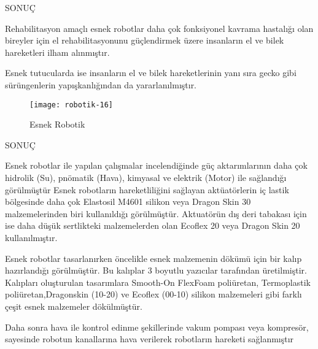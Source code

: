 \documentclass{beamer}
\begin{document}
\begin{frame}{SONUÇ}
\begin{block}
\item Rehabilitasyon amaçlı esnek robotlar daha çok fonksiyonel kavrama hastalığı olan bireyler için el rehabilitasyonunu güçlendirmek üzere insanların el ve bilek hareketleri ilham alınmıştır. 

\item Esnek tutucularda ise insanların el ve bilek hareketlerinin yanı sıra gecko gibi
sürüngenlerin yapışkanlığından da yararlanılmıştır. 
\begin{figure}
\texttt{[image: robotik-16]}
\caption{\label{Şekil-15} Esnek Robotik}
\end{figure}
\end{block}
\end{frame}

\begin{frame}{SONUÇ}
\begin{block}
\item Esnek robotlar ile yapılan çalışmalar incelendiğinde güç aktarımlarının daha çok hidrolik (Su), pnömatik (Hava), kimyasal ve elektrik (Motor) ile sağlandığı görülmüştür Esnek robotların hareketliliğini sağlayan aktüatörlerin iç lastik bölgesinde daha çok Elastosil M4601 silikon veya Dragon Skin 30 malzemelerinden biri kullanıldığı görülmüştür. Aktuatörün dış deri tabakası için ise daha düşük sertlikteki malzemelerden olan Ecoflex 20 veya Dragon Skin 20 kullanılmıştır.
\end{block}
\end{frame}

\begin{frame}
\begin{block}
\item Esnek robotlar tasarlanırken öncelikle esnek malzemenin dökümü için bir kalıp hazırlandığı görülmüştür. Bu kalıplar 3 boyutlu yazıcılar tarafından üretilmiştir. Kalıpları oluşturulan tasarımlara Smooth-On FlexFoam poliüretan, Termoplastik poliüretan,Dragonskin (10-20) ve Ecoflex (00-10) silikon malzemeleri gibi farklı çeşit esnek malzemeler dökülmüştür. 

\item Daha sonra hava ile kontrol edinme şekillerinde vakum pompası veya kompresör, sayesinde robotun kanallarına hava verilerek robotların hareketi sağlanmıştır
\end{block}
\end{frame}
\end{document}
